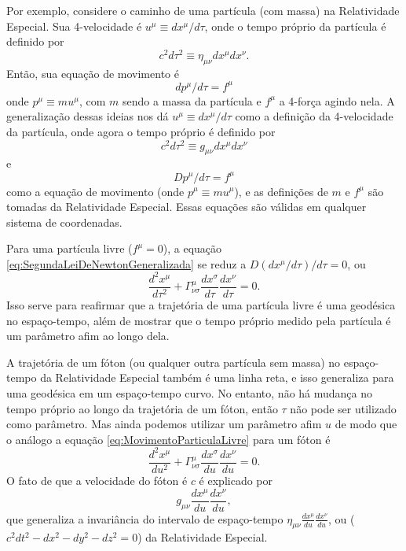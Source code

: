 Por exemplo, considere o caminho de uma partícula (com massa) na Relatividade Especial. Sua 4-velocidade é $u^{\mu}\equiv dx^{\mu}/d\tau$, onde o tempo próprio da partícula é definido por
\[
	c^2d\tau^2 \equiv \eta_{\mu\nu} dx^{\mu}dx^\nu.
\]
Então, sua equação de movimento é
\[
	dp^\mu/d\tau=f^\mu
\]
onde $p^\mu \equiv mu^\mu$, com $m$ sendo a massa da partícula e $f^\mu$ a 4-força agindo nela. A generalização dessas ideias nos dá $u^{\mu}\equiv dx^{\mu}/d\tau$ como a definição da 4-velocidade da partícula, onde agora o tempo próprio é definido por
\begin{equation}\label{eq:DefinicaoTempoProprioRelatividadeGeral}
	c^2d\tau^2 \equiv g_{\mu\nu} dx^\mu dx^\nu
\end{equation}
e
\begin{equation}\label{eq:SegundaLeiDeNewtonGeneralizada}
	Dp^\mu/d\tau = f^\mu
\end{equation}
como a equação de movimento (onde $p^\mu\equiv mu^\mu$), e as definições de $m$ e $f^\mu$ são tomadas da Relatividade Especial. Essas equações são válidas em qualquer sistema de coordenadas.

Para uma partícula livre ($f^\mu=0$), a equação \eqref{eq:SegundaLeiDeNewtonGeneralizada} se reduz a $D(dx^\mu/d\tau)/d\tau = 0$, ou
\begin{equation}\label{eq:MovimentoParticulaLivre}
	\boxed{
		\frac{d^{2} x^{\mu}}{d \tau^{2}}+\Gamma_{\nu \sigma}^{\mu} \frac{d x^{\sigma}}{d \tau} \frac{d x^{\nu}}{d \tau}=0.
	}
\end{equation}
Isso serve para reafirmar que a trajetória de uma partícula livre é uma geodésica no espaço-tempo, além de mostrar que o tempo próprio medido pela partícula é um parâmetro afim ao longo dela.

A trajetória de um fóton (ou qualquer outra partícula sem massa) no espaço-tempo da Relatividade Especial também é uma linha reta, e isso generaliza para uma geodésica em um espaço-tempo curvo. No entanto, não há mudança no tempo próprio ao longo da trajetória de um fóton, então $\tau$ não pode ser utilizado como parâmetro. Mas ainda podemos utilizar um parâmetro afim $u$ de modo que o análogo a equação \eqref{eq:MovimentoParticulaLivre} para um fóton é
\begin{equation}\label{eq:MovimentoFoton}
	\boxed{
		\frac{d^{2} x^{\mu}}{d u^{2}}+\Gamma_{\nu \sigma}^{\mu} \frac{d x^{\sigma}}{d u} \frac{d x^{\nu}}{d u}=0.
	}
\end{equation}
O fato de que a velocidade do fóton é $c$ é explicado por
\begin{equation}
	g_{\mu\nu}\frac{dx^\mu}{du}\frac{dx^\nu}{du},
\end{equation}
que generaliza a invariância do intervalo de espaço-tempo $\eta_{\mu\nu}\frac{dx^\mu}{du}\frac{dx^\nu}{du}$, ou ($c^2dt^2-dx^2-dy^2-dz^2=0$) da Relatividade Especial.


